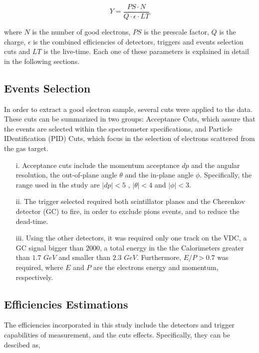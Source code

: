 \documentclass[preprint,12pt]{elsarticle}
\begin{document}
\begin{equation}
Y = \frac{PS \cdot N}{ Q \cdot \epsilon \cdot LT }
\label{eq:yield}
\end{equation}

\noindent where $N$ is the number of good electrons, $PS$ is the prescale factor, $Q$ is the charge, $\epsilon $ is the combined efficiencies of detectors, triggers and events selection cuts and $LT$ is the live-time. Each one of these parameters is explained in detail in the following sections.

\subsection{Events Selection}
In order to extract a good electron sample, several cuts were applied to the data. These cuts can be summarized in two groups: Acceptance Cuts, which assure that the events are selected within the spectrometer specifications, and Particle IDentification (PID) Cuts, which focus in the selection of electrons scattered from the gas target. 

\begin{itemize}
\item[i.]Acceptance cuts include the momentum acceptance $dp$ and the angular resolution, the out-of-plane angle $\theta $ and the in-plane angle $\phi $. Specifically, the range used in the study 
are $|dp| < 5 $ ,  $|\theta| < 4  $ and $|\phi| < 3 $.

\item[ii.] The trigger selected required both scintillator planes and the Cherenkov detector (GC) to fire, in order to exclude pions events, and to reduce the dead-time.

\item[iii.]Using the other detectors, it was required only one track on the VDC, a GC signal bigger than $2000$, a total energy in the the Calorimeters greater than $1.7$ $GeV$  and smaller than $2.3$ $GeV$. Furthermore,  $E/P>0.7$ was required, where $E$ and $P$ are the electrons energy and momentum, respectively.
\end{itemize}

\subsection{Efficiencies Estimations } 

The efficiencies incorporated in this study include the detectors and trigger capabilities of measurement, and the cuts effects. Specifically, they can be descibed as, 
\end{document}
